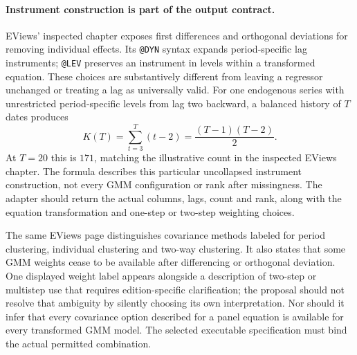 \paragraph{Instrument construction is part of the output contract.}
EViews' inspected chapter exposes first differences and orthogonal deviations
for removing individual effects. Its \texttt{@DYN} syntax expands
period-specific lag instruments; \texttt{@LEV} preserves an instrument in
levels within a transformed equation. These choices are substantively
different from leaving a regressor unchanged or treating a lag as universally
valid. For one endogenous series with unrestricted period-specific levels
from lag two backward, a balanced history of $T$ dates produces
\begin{equation}
 K(T)=\sum_{t=3}^{T}(t-2)=\frac{(T-1)(T-2)}{2}.
 \label{exec19:dynamic-instruments}
\end{equation}
At $T=20$ this is $171$, matching the illustrative count in the inspected
EViews chapter. The formula describes this particular uncollapsed instrument
construction, not every GMM configuration or rank after missingness. The
adapter should return the actual columns, lags, count and rank, along with
the equation transformation and one-step or two-step weighting choices.
\citep{exec19_dynamic_eviews_panel,exec19_dynamic_reference}

The same EViews page distinguishes covariance methods labeled for period
clustering, individual clustering and two-way clustering. It also states
that some GMM weights cease to be available after differencing or orthogonal
deviation. One displayed weight label appears alongside a description of
two-step or multistep use that requires edition-specific clarification; the
proposal should not resolve that ambiguity by silently choosing its own
interpretation. Nor should it infer that every covariance option described
for a panel equation is available for every transformed GMM model. The
selected executable specification must bind the actual permitted combination.
\citep{exec19_dynamic_eviews_panel}

